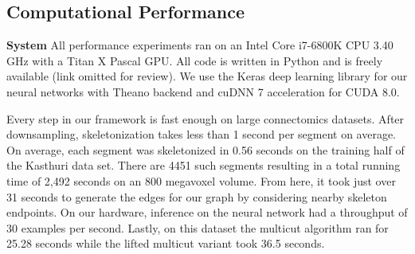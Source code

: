 \begin{table}[h]
	\caption{Precision, recall, and accuracy changes between CNN only and CNN paired with graph-optimized reconstructions for the training and three test datasets. The combined method results in better precision and accuracy. The lifted multicut extension provides very slight improvements in recall and accuracy over these three datasets.}
	\centering
{}
	\label{table:multicut}
\end{table}


\subsection{Computational Performance}
\noindent\textbf{System}
All performance experiments ran on an Intel Core i7-6800K CPU 3.40 GHz with a Titan X Pascal GPU. All code is written in Python and is freely available (link omitted for review). We use the Keras deep learning library for our neural networks with Theano backend and cuDNN 7 acceleration for CUDA 8.0.

Every step in our framework is fast enough on large connectomics datasets. 
After downsampling, skeletonization takes less than 1 second per segment on average. 
On average, each segment was skeletonized in 0.56 seconds on the training half of the Kasthuri data set. 
There are 4451 such segments resulting in a total running time of 2,492 seconds on an 800 megavoxel volume. 
From here, it took just over 31 seconds to generate the edges for our graph by considering nearby skeleton endpoints.
On our hardware, inference on the neural network had a throughput of 30 examples per second. 
Lastly, on this dataset the multicut algorithm ran for 25.28 seconds while the lifted multicut variant took 36.5 seconds.
